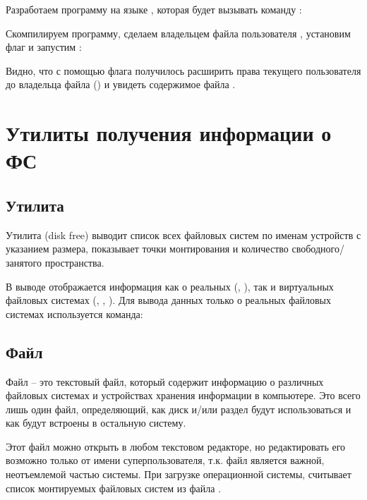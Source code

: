 Разработаем программу на языке , которая будет вызывать команду :


Скомпилируем программу, сделаем владельцем файла пользователя , установим флаг  и запустим :


Видно, что с помощью флага  получилось расширить права текущего пользователя до владельца файла () и увидеть содержимое файла .

\section{Утилиты получения информации о ФС}

\subsection{Утилита }

Утилита  (disk free) выводит список всех файловых систем по именам устройств с указанием размера, показывает точки монтирования и количество свободного/занятого пространства.


В выводе отображается информация как о реальных (, ), так и виртуальных файловых системах (, , ). Для вывода данных только о реальных файловых системах используется команда:


\subsection{Файл }

Файл  -- это текстовый файл, который содержит информацию о различных файловых системах и устройствах хранения информации в компьютере. Это всего лишь один файл, определяющий, как диск и/или раздел будут использоваться и как будут встроены в остальную систему. 

Этот файл можно открыть в любом текстовом редакторе, но редактировать его возможно только от имени суперпользователя, т.к. файл является важной, неотъемлемой частью системы. При загрузке операционной системы,  считывает список монтируемых файловых систем из файла .



